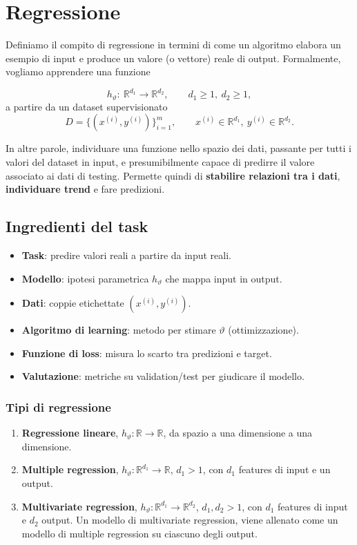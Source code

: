 \chapter{Regressione}
Definiamo il compito di regressione in termini di come un algoritmo elabora un esempio
di input e produce un valore (o vettore) reale di output. Formalmente, vogliamo
apprendere una funzione


\[
h_\vartheta:\ \mathbb{R}^{d_1}\rightarrow \mathbb{R}^{d_2},\qquad d_1\ge 1,\ d_2\ge 1,
\]
a partire da un dataset supervisionato
\[
D=\{(x^{(i)},y^{(i)})\}_{i=1}^m,\qquad x^{(i)}\in\mathbb{R}^{d_1},\ y^{(i)}\in\mathbb{R}^{d_2}.
\]

\noindent
In altre parole, individuare una funzione nello spazio dei dati, passante per tutti i valori del dataset in input, e presumibilmente capace di predirre il valore associato ai dati di testing. Permette quindi di \textbf{stabilire relazioni tra i dati}, \textbf{individuare trend} e fare predizioni.

\section{Ingredienti del task}
\begin{itemize}
  \item \textbf{Task}: predire valori reali a partire da input reali.
  \item \textbf{Modello}: ipotesi parametrica \(h_\vartheta\) che mappa input in output.
  \item \textbf{Dati}: coppie etichettate \((x^{(i)},y^{(i)})\).
  \item \textbf{Algoritmo di learning}: metodo per stimare \(\vartheta\) (ottimizzazione).
  \item \textbf{Funzione di loss}: misura lo scarto tra predizioni e target.
  \item \textbf{Valutazione}: metriche su validation/test per giudicare il modello.
\end{itemize}

\subsection{Tipi di regressione}

\begin{enumerate}
	\item \textbf{Regressione lineare}, $h_\vartheta : \mathbb{R} \to \mathbb{R}$, da spazio a una dimensione a una dimensione.
	\item \textbf{Multiple regression}, $h_\vartheta : \mathbb{R}^{d_1} \to \mathbb{R}$, $d_1 > 1$, con $d_1$ features di input e un output.
	\item \textbf{Multivariate regression}, $h_\vartheta : \mathbb{R}^{d_1} \to \mathbb{R}^{d_2}$, $d_1, d_2 > 1$, con $d_1$ features di input e $d_2$ output. Un modello di multivariate regression, viene allenato come un modello di multiple regression su ciascuno degli output.
\end{enumerate} 

